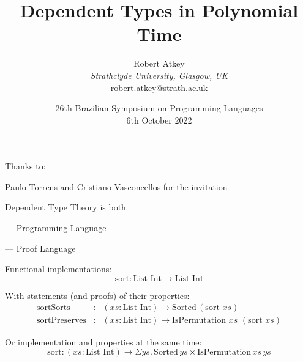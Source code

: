 \documentclass[xetex,serif,mathserif,aspectratio=169]{beamer}
\title{Dependent Types in Polynomial Time}
\author{Robert Atkey \\
  \emph{Strathclyde University, Glasgow, UK} \\
  robert.atkey@strath.ac.uk}
\date{26th Brazilian Symposium on Programming Languages \\ 6th October 2022}
\newcommand{\youtem}{\quad \textcolor{titlered!80}{---} \quad}
\newcommand{\HEAD}[1]{\textcolor{titlered}{#1}}
\begin{document}
\frame{\titlepage}




\begin{frame}
  Thanks to:

  \bigskip

  Paulo Torrens and Cristiano Vasconcellos for the invitation

\end{frame}

\begin{frame}

  \HEAD{Dependent Type Theory is both}

  \bigskip

  \youtem Programming Language

  \raggedleft {}

  \raggedright

  \medskip

  \youtem Proof Language

  \raggedleft {}


  \pause \pause \pause

\end{frame}

\begin{frame}
  Functional implementations:
  \medskip
  \begin{displaymath}
    \mathrm{sort} : \mathrm{List}\,\,\mathrm{Int} \to \mathrm{List}\,\,\mathrm{Int}
  \end{displaymath}

  \pause
  With statements (and proofs) of their properties:
  \medskip
  \begin{displaymath}
    \begin{array}{lcl}
      \mathrm{sortSorts} &:& (\mathit{xs} : \mathrm{List}\,\,\mathrm{Int}) \to \mathrm{Sorted}\,(\mathrm{sort}\,\,\mathit{xs}) \\
      \mathrm{sortPreserves} &:& (\mathit{xs} : \mathrm{List}\,\,\mathrm{Int}) \to \mathrm{IsPermutation}\,\,\mathit{xs}\,\,(\mathrm{sort}\,\,\mathit{xs})
    \end{array}
  \end{displaymath}

  \pause
  Or implementation and properties at the same time:
  \medskip
  \begin{displaymath}
    \mathrm{sort} : (\mathit{xs} : \mathrm{List}\,\,\mathrm{Int}) \to \Sigma \mathit{ys}.\,\mathrm{Sorted}\,\mathit{ys} \times \mathrm{IsPermutation}\,\mathit{xs}\,\mathit{ys}
  \end{displaymath}
\end{frame}
\end{document}
